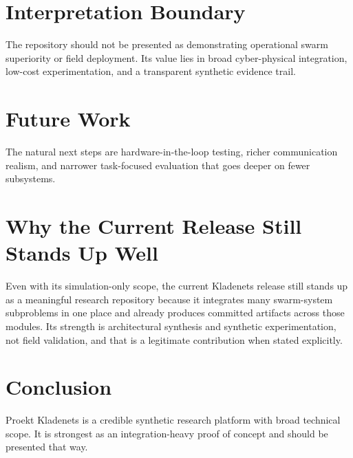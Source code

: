 \documentclass[conference]{IEEEtran}
\begin{document}
\section{Interpretation Boundary}
The repository should not be presented as demonstrating operational swarm superiority or field deployment. Its value lies in broad cyber-physical integration, low-cost experimentation, and a transparent synthetic evidence trail.

\section{Future Work}
The natural next steps are hardware-in-the-loop testing, richer communication realism, and narrower task-focused evaluation that goes deeper on fewer subsystems.

\section{Why the Current Release Still Stands Up Well}
Even with its simulation-only scope, the current Kladenets release still stands
up as a meaningful research repository because it integrates many swarm-system
subproblems in one place and already produces committed artifacts across those
modules. Its strength is architectural synthesis and synthetic experimentation,
not field validation, and that is a legitimate contribution when stated
explicitly.

\section{Conclusion}
Proekt Kladenets is a credible synthetic research platform with broad technical scope. It is strongest as an integration-heavy proof of concept and should be presented that way.



\end{document}
